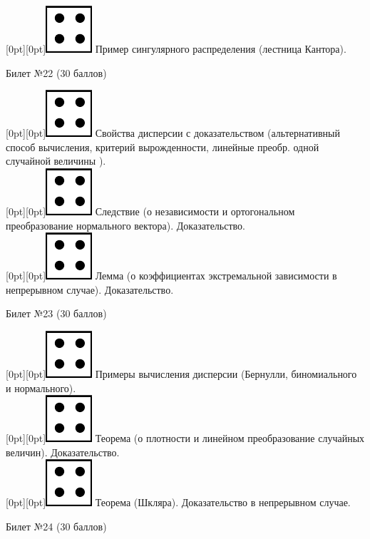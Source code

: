 \documentclass[preview]{standalone}
\begin{document}
\raisebox{-1pt}[0pt][0pt]{\includegraphics[width=0.02\linewidth]{4.png}}   Пример сингулярного распределения (лестница Кантора). \\
\begin{center} {\Large Билет №22 (30 баллов)} \end{center}
\raisebox{-1pt}[0pt][0pt]{\includegraphics[width=0.02\linewidth]{4.png}} Свойства дисперсии с доказательством (альтернативный способ вычисления, критерий вырожденности, линейные преобр. одной случайной величины ). \\ 
\raisebox{-1pt}[0pt][0pt]{\includegraphics[width=0.02\linewidth]{4.png}} Следствие (о независимости и  ортогональном преобразование нормального вектора). Доказательство. \\ 
\raisebox{-1pt}[0pt][0pt]{\includegraphics[width=0.02\linewidth]{4.png}} Лемма (о коэффициентах экстремальной зависимости в непрерывном случае). Доказательство. \\
\begin{center} {\Large Билет №23 (30 баллов)} \end{center}
\raisebox{-1pt}[0pt][0pt]{\includegraphics[width=0.02\linewidth]{4.png}} Примеры вычисления дисперсии (Бернулли, биномиального и нормального). \\
\raisebox{-1pt}[0pt][0pt]{\includegraphics[width=0.02\linewidth]{4.png}} Теорема (о плотности и линейном преобразование случайных величин). Доказательство. \\
\raisebox{-1pt}[0pt][0pt]{\includegraphics[width=0.02\linewidth]{4.png}} Теорема (Шкляра). Доказательство в непрерывном случае. \\
\begin{center} {\Large Билет №24 (30 баллов)} \end{center}
\end{document}

